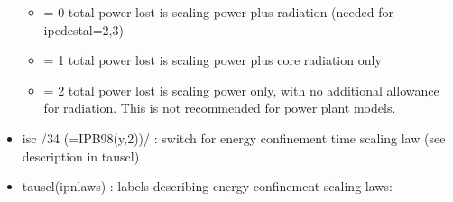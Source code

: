 \documentclass[]{article}
\providecommand{\tightlist}{%
  \setlength{\itemsep}{0pt}\setlength{\parskip}{0pt}}
\begin{document}
\begin{itemize}
  \begin{itemize}
  \tightlist
  \item
    = 0 total power lost is scaling power plus radiation (needed for
    ipedestal=2,3)
  \item
    = 1 total power lost is scaling power plus core radiation only
  \item
    = 2 total power lost is scaling power only, with no additional
    allowance for radiation. This is not recommended for power plant
    models.
  \end{itemize}
\item
  isc /34 (=IPB98(y,2))/ : switch for energy confinement time scaling
  law (see description in tauscl)
\item
  tauscl(ipnlaws) : labels describing energy confinement scaling laws:


\end{itemize}
\end{document}
